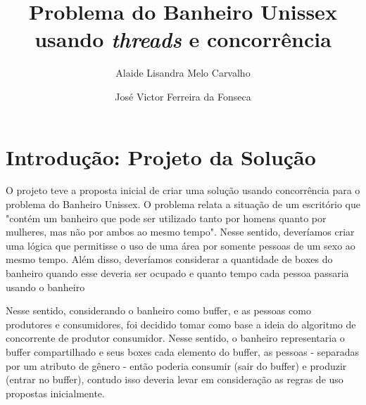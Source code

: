\documentclass[review]{elsarticle}
\begin{document}
\pagestyle{fancy}
\fancyhead{} %
\fancyfoot{} %
\renewcommand{\footrulewidth}{0.4pt}%

\begin{frontmatter}

\title{Problema do Banheiro Unissex usando \textit{threads} e concorrência}

\author{Alaide Lisandra Melo Carvalho}
\address{Instituto Metrópole Digital - IMD / \href{lisandra.melo.095@ufrn.edu.br}{lisandra.melo.095@ufrn.edu.br}}
\author{José Victor Ferreira da Fonseca}
\address{Instituto Metrópole Digital - IMD/ \href{jose.victor.ferreira.125@ufrn.edu.br}{jose.victor.ferreira.125@ufrn.edu.br}}

\end{frontmatter}
\thispagestyle{empty} 

\headrule

\section{Introdução: Projeto da Solução}

O projeto teve a proposta inicial de criar uma solução usando concorrência para o problema do Banheiro Unissex. O problema relata a situação de um escritório que "contém um banheiro que pode ser utilizado tanto por homens quanto por mulheres, mas não por ambos ao mesmo tempo". Nesse sentido, deveríamos criar uma lógica que permitisse o uso de uma área por somente pessoas de um sexo ao mesmo tempo. Além disso, deveríamos considerar a quantidade de boxes do banheiro quando esse deveria ser ocupado e quanto tempo cada pessoa passaria usando o banheiro

Nesse sentido, considerando o banheiro como buffer, e as pessoas como produtores e consumidores, foi decidido tomar como base a ideia do algoritmo de concorrente de produtor consumidor. Nesse sentido, o banheiro representaria o buffer compartilhado e seus boxes cada elemento do buffer, as pessoas - separadas por um atributo de gênero - então poderia consumir (sair do buffer) e produzir (entrar no buffer), contudo isso deveria levar em consideração as regras de uso propostas inicialmente.
\end{document}
